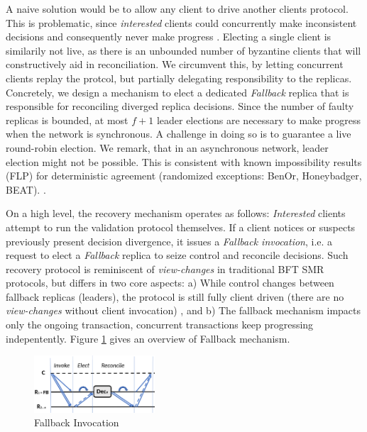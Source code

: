 A naive solution would be to allow any client to drive another clients protocol. This is problematic, since \textit{interested} clients could concurrently make inconsistent decisions and consequently never make progress . Electing a single client is similarily not live, as there is an unbounded number of byzantine clients that will constructively aid in reconciliation. We circumvent this, by letting concurrent clients replay the protcol, but partially delegating responsibility to the replicas. Concretely, we design a mechanism to elect  a dedicated \textit{Fallback} replica that is responsible for reconciling diverged replica decisions. Since the number of faulty replicas is bounded, at most $f+1$ leader elections are necessary to make progress when the network is synchronous. A challenge in doing so is to guarantee a live round-robin election. We remark, that in an asynchronous network, leader election might not be possible. This is consistent with known impossibility results (FLP) \cite{fischer1985impossibility} for deterministic agreement (randomized exceptions: BenOr, Honeybadger, BEAT). . 

On a high level, the recovery mechanism operates as follows: \textit{Interested} clients attempt to run the validation protocol themselves. If a client notices or suspects previously present decision divergence, it issues a \textit{Fallback invocation}, i.e. a request to elect a \textit{Fallback} replica to seize control and reconcile decisions. Such recovery protocol is reminiscent of \textit{view-changes} in traditional BFT SMR protocols, but differs in two core aspects: a) While control changes between fallback replicas (leaders), the protocol is still fully client driven (there are no \textit{view-changes} without client invocation) , and b) The fallback mechanism impacts only the ongoing transaction, concurrent transactions keep progressing indepentently. Figure \ref{fig:FallB} gives an overview of Fallback mechanism.

\begin{figure}

\includegraphics[width= 0.4\textwidth]{./figures/Fallback.png}

\caption{Fallback Invocation}
\label{fig:FallB}
\end{figure}


